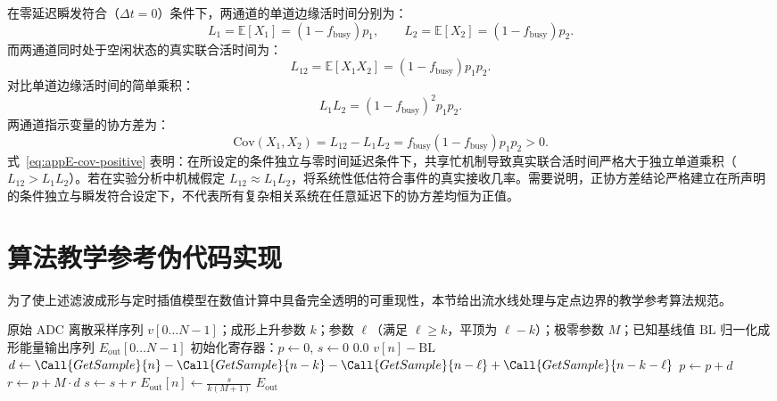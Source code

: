 在零延迟瞬发符合（$\Delta t = 0$）条件下，两通道的单道边缘活时间分别为：
\begin{equation}\label{eq:appE-l1-l2}
L_1 = \mathbb{E}[X_1] = (1 - f_{\mathrm{busy}}) p_1, \qquad L_2 = \mathbb{E}[X_2] = (1 - f_{\mathrm{busy}}) p_2.
\end{equation}
而两通道同时处于空闲状态的真实联合活时间为：
\begin{equation}\label{eq:appE-l12-shared}
L_{12} = \mathbb{E}[X_1 X_2] = (1 - f_{\mathrm{busy}}) p_1 p_2.
\end{equation}
对比单道边缘活时间的简单乘积：
\begin{equation}\label{eq:appE-l1l2-product}
L_1 L_2 = (1 - f_{\mathrm{busy}})^2 p_1 p_2.
\end{equation}
两通道指示变量的协方差为：
\begin{equation}\label{eq:appE-cov-positive}
\mathrm{Cov}(X_1, X_2) = L_{12} - L_1 L_2 = f_{\mathrm{busy}} (1 - f_{\mathrm{busy}}) p_1 p_2 > 0.
\end{equation}
式~\eqref{eq:appE-cov-positive} 表明：在所设定的条件独立与零时间延迟条件下，共享忙机制导致真实联合活时间严格大于独立单道乘积（$L_{12} > L_1 L_2$）。若在实验分析中机械假定 $L_{12} \approx L_1 L_2$，将系统性低估符合事件的真实接收几率。需要说明，正协方差结论严格建立在所声明的条件独立与瞬发符合设定下，不代表所有复杂相关系统在任意延迟下的协方差均恒为正值。

\section{算法教学参考伪代码实现}\label{sec:appE-pseudocode}

为了使上述滤波成形与定时插值模型在数值计算中具备完全透明的可重现性，本节给出流水线处理与定点边界的教学参考算法规范。

\begin{algorithm}[!htbp]
\caption{数字梯形滤波流水线参考算法}\label{alg:appE-trapezoid}
\begin{algorithmic}[1]
\Require 原始 ADC 离散采样序列 $v[0 \dots N-1]$；成形上升参数 $k$；参数 $\ell$（满足 $\ell \ge k$，平顶为 $\ell - k$）；极零参数 $M$；已知基线值 $\mathrm{BL}$
\Ensure 归一化成形能量输出序列 $E_{\mathrm{out}}[0 \dots N-1]$
\State 初始化寄存器：$p \gets 0$, $s \gets 0$
 
        \State \Return $0.0$
    \Else
        \State \Return $v[n] - \mathrm{BL}$ 
    \EndIf
\EndFunction
{}
    \State $d \gets \Call{GetSample}{n} - \Call{GetSample}{n - k} - \Call{GetSample}{n - \ell} + \Call{GetSample}{n - k - \ell}$
    \State $p \gets p + d$
    \State $r \gets p + M \cdot d$
    \State $s \gets s + r$
    \State $E_{\mathrm{out}}[n] \gets \frac{s}{k (M + 1)}$ 
\EndFor
\State \Return $E_{\mathrm{out}}$
\end{algorithmic}
\end{algorithm}

